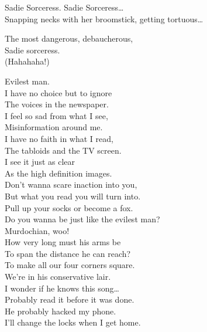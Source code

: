 
Sadie Sorceress. Sadie Sorceress… \\
Snapping necks with her broomstick, getting tortuous… \\


The most dangerous, debaucherous, \\
Sadie sorceress. \\
(Hahahaha!) \\





Evilest man. \\

I have no choice but to ignore \\
The voices in the newspaper. \\
I feel so sad from what I see, \\
Misinformation around me. \\

I have no faith in what I read, \\
The tabloids and the TV screen. \\
I see it just as clear \\
As the high definition images. \\

Don't wanna scare inaction into you, \\
But what you read you will turn into. \\
Pull up your socks or become a fox. \\
Do you wanna be just like the evilest man? \\
Murdochian, woo! \\

How very long must his arms be \\
To span the distance he can reach? \\
To make all our four corners square. \\
We're in his conservative lair. \\

I wonder if he knows this song… \\
Probably read it before it was done. \\
He probably hacked my phone. \\
I'll change the locks when I get home. \\

